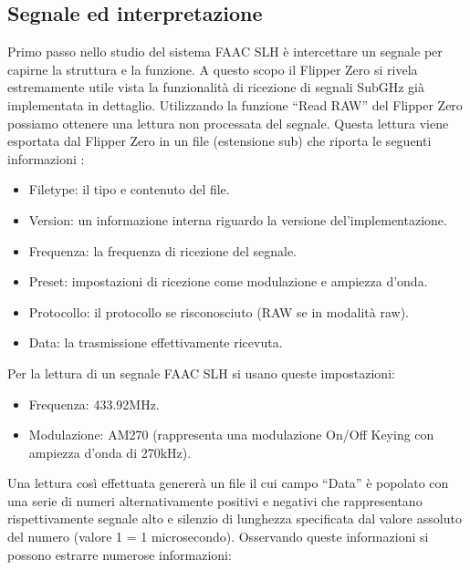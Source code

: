 \subsection{Segnale ed interpretazione}
\label{sub:signal}

Primo passo nello studio del sistema FAAC SLH è intercettare un segnale per capirne la struttura e la funzione. A questo scopo il Flipper Zero si rivela estremamente utile vista la funzionalità di ricezione di segnali SubGHz già implementata in dettaglio. Utilizzando la funzione “Read RAW” del Flipper Zero possiamo ottenere una lettura non processata del segnale. Questa lettura viene esportata dal Flipper Zero in un file (estensione sub) che riporta le seguenti informazioni \cite{subghz}:
\begin{itemize}
  \item Filetype: il tipo e contenuto del file.
  \item Version: un informazione interna riguardo la versione del’implementazione.
  \item Frequenza: la frequenza di ricezione del segnale.
  \item Preset: impostazioni di ricezione come modulazione e ampiezza d’onda.
  \item Protocollo: il protocollo se risconosciuto (RAW se in modalità raw).
  \item Data: la trasmissione effettivamente ricevuta.
\end{itemize}
Per la lettura di un segnale FAAC SLH si usano queste impostazioni:
\begin{itemize}
  \item Frequenza: 433.92MHz.
  \item Modulazione: AM270 (rappresenta una modulazione On/Off Keying con ampiezza d’onda di 270kHz).
\end{itemize}
Una lettura così effettuata genererà un file il cui campo “Data” è popolato con una serie di numeri alternativamente positivi e negativi che rappresentano rispettivamente segnale alto e silenzio di lunghezza specificata dal valore assoluto del numero (valore 1 = 1 microsecondo). Osservando queste informazioni si possono estrarre numerose informazioni:
